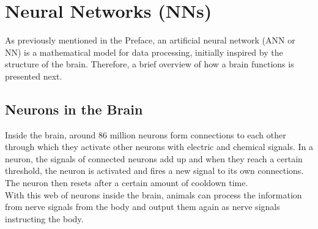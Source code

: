 \section{Neural Networks (NNs)}\label{sec:neural-networks-(nns)}

As previously mentioned in the Preface, an artificial neural network (ANN or NN) is a mathematical model for data processing, initially inspired by the structure of the brain.
Therefore, a brief overview of how a brain functions is presented next.

\subsection{Neurons in the Brain}\label{subsec:neurons-in-the-brain}
Inside the brain, around 86 million neurons\cite{caruso_23} form connections to each other through which they activate other neurons with electric and chemical signals.
In a neuron, the signals of connected neurons add up and when they reach a certain threshold, the neuron is activated and fires a new signal to its own connections\cite{Newman_23}.
The neuron then resets after a certain amount of cooldown time.
\\
With this web of neurons inside the brain, animals can process the information from nerve signals from the body and output them again as nerve signals instructing the body.

